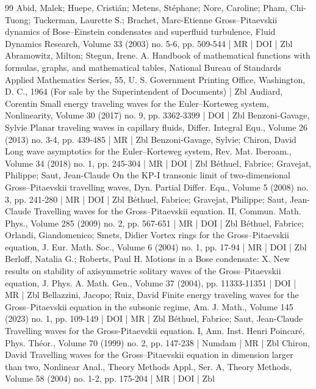 \begin{thebibliography}{99}
Abid, Malek; Huepe, Cristián; Metens, Stéphane; Nore, Caroline; Pham, Chi-Tuong; Tuckerman, Laurette S.; Brachet, Marc-Etienne Gross–Pitaevskii dynamics of Bose–Einstein condensates and superfluid turbulence, Fluid Dynamics Research, Volume 33 (2003) no. 5-6, pp. 509-544 | MR | DOI | Zbl
Abramowitz, Milton; Stegun, Irene. A. Handbook of mathematical functions with formulas, graphs, and mathematical tables, National Bureau of Standards Applied Mathematics Series, 55, U. S. Government Printing Office, Washington, D. C., 1964 (For sale by the Superintendent of Documents) | Zbl
Audiard, Corentin Small energy traveling waves for the Euler–Korteweg system, Nonlinearity, Volume 30 (2017) no. 9, pp. 3362-3399 | DOI | Zbl
Benzoni-Gavage, Sylvie Planar traveling waves in capillary fluids, Differ. Integral Equ., Volume 26 (2013) no. 3-4, pp. 439-485 | MR | Zbl
Benzoni-Gavage, Sylvie; Chiron, David Long wave asymptotics for the Euler–Korteweg system, Rev. Mat. Iberoam., Volume 34 (2018) no. 1, pp. 245-304 | MR | DOI | Zbl
Béthuel, Fabrice; Gravejat, Philippe; Saut, Jean-Claude On the KP-I transonic limit of two-dimensional Gross–Pitaevskii travelling waves, Dyn. Partial Differ. Equ., Volume 5 (2008) no. 3, pp. 241-280 | MR | DOI | Zbl
Béthuel, Fabrice; Gravejat, Philippe; Saut, Jean-Claude Travelling waves for the Gross–Pitaevskii equation. II, Commun. Math. Phys., Volume 285 (2009) no. 2, pp. 567-651 | MR | DOI | Zbl
Béthuel, Fabrice; Orlandi, Giandomenico; Smets, Didier Vortex rings for the Gross–Pitaevskii equation, J. Eur. Math. Soc., Volume 6 (2004) no. 1, pp. 17-94 | MR | DOI | Zbl
Berloff, Natalia G.; Roberts, Paul H. Motions in a Bose condensate: X. New results on stability of axisymmetric solitary waves of the Gross–Pitaevskii equation, J. Phys. A. Math. Gen., Volume 37 (2004), pp. 11333-11351 | DOI | MR | Zbl
Bellazzini, Jacopo; Ruiz, David Finite energy traveling waves for the Gross–Pitaevskii equation in the subsonic regime, Am. J. Math., Volume 145 (2023) no. 1, pp. 109-149 | DOI | MR | Zbl
Béthuel, Fabrice; Saut, Jean-Claude Travelling waves for the Gross-Pitaevskii equation. I, Ann. Inst. Henri Poincaré, Phys. Théor., Volume 70 (1999) no. 2, pp. 147-238 | Numdam | MR | Zbl
Chiron, David Travelling waves for the Gross–Pitaevskii equation in dimension larger than two, Nonlinear Anal., Theory Methods Appl., Ser. A, Theory Methods, Volume 58 (2004) no. 1-2, pp. 175-204 | MR | DOI | Zbl

\end{thebibliography}

